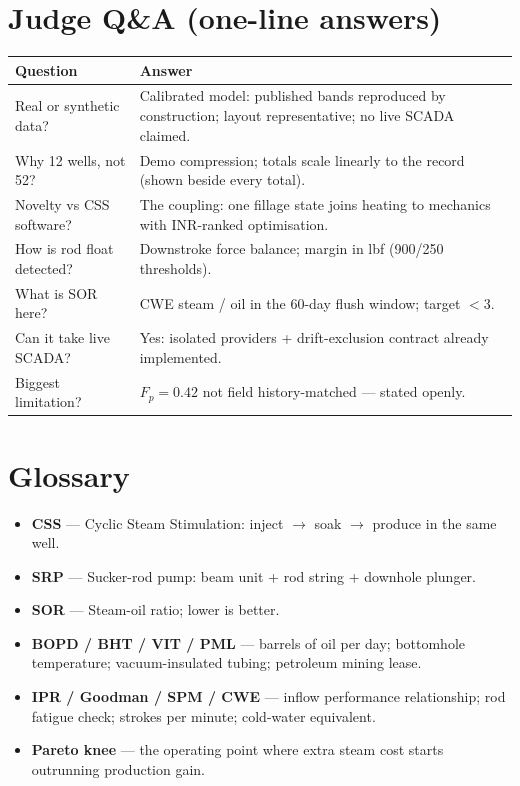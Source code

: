 \documentclass[12pt,a4paper]{report}
\begin{document}
\chapter{Judge Q\&A (one-line answers)}
\begin{table}[h]
\centering
\begin{tabular}{p{5.5cm}p{9.5cm}}
\toprule
\textbf{Question} & \textbf{Answer} \\ \midrule
Real or synthetic data? & Calibrated model: published bands reproduced by
construction; layout representative; no live SCADA claimed. \\
Why 12 wells, not 52? & Demo compression; totals scale linearly to the record
(shown beside every total). \\
Novelty vs CSS software? & The coupling: one fillage state joins heating to
mechanics with INR-ranked optimisation. \\
How is rod float detected? & Downstroke force balance; margin in lbf
(900/250 thresholds). \\
What is SOR here? & CWE steam / oil in the 60-day flush window; target $<3$. \\
Can it take live SCADA? & Yes: isolated providers + drift-exclusion contract
already implemented. \\
Biggest limitation? & $F_p=0.42$ not field history-matched --- stated openly. \\
\bottomrule
\end{tabular}
\end{table}

\chapter{Glossary}
\begin{itemize}
  \item \textbf{CSS} --- Cyclic Steam Stimulation: inject $\rightarrow$ soak
    $\rightarrow$ produce in the same well.
  \item \textbf{SRP} --- Sucker-rod pump: beam unit + rod string + downhole
    plunger.
  \item \textbf{SOR} --- Steam-oil ratio; lower is better.
  \item \textbf{BOPD / BHT / VIT / PML} --- barrels of oil per day; bottomhole
    temperature; vacuum-insulated tubing; petroleum mining lease.
  \item \textbf{IPR / Goodman / SPM / CWE} --- inflow performance relationship;
    rod fatigue check; strokes per minute; cold-water equivalent.
  \item \textbf{Pareto knee} --- the operating point where extra steam cost
    starts outrunning production gain.
\end{itemize}
\end{document}
